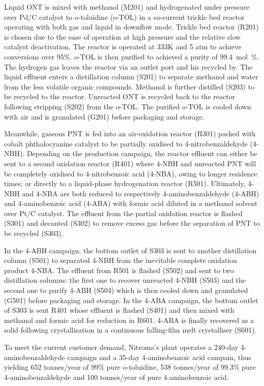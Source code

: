 Liquid ONT is mixed with methanol (M201) and hydrogenated under pressure over Pd/C catalyst to o-toluidine (o-TOL) in a co-current trickle bed reactor operating with both gas and liquid in downflow mode. Trickle bed reactor (R201) is chosen due to the ease of operation at high pressure and the relative slow catalyst deactivation. The reactor is operated at 333K and 5 atm to achieve conversions over 95\%. o-TOL is then purified to achieved a purity of \SI{99.4}{mol\percent}. The hydrogen gas leaves the reactor via an outlet port and his recycled by. The liquid effluent enters a distillation column (S201) to separate methanol and water from the less volatile organic compounds. Methanol is further distilled (S203) to be recycled to the reactor. Unreacted ONT is recycled back to the reactor following stripping (S202) from the o-TOL. The purified o-TOL is cooled down with air and is granulated (G201) before packaging and storage.

Meanwhile, gaseous PNT is fed into an air-oxidation reactor (R301) packed with cobalt phthalocyanine catalyst to be partially oxidised to 4-nitrobenzaldehyde (4-NBH). Depending on the production campaign, the reactor effluent can either be sent to a second oxidation reactor (R401) where 4-NBH and unreacted PNT will be completely oxidised to 4-nitrobenzoic acid (4-NBA), owing to longer residence times; or directly to a liquid-phase hydrogenation reactor (R501). Ultimately, 4-NBH and 4-NBA are both reduced to respectively 4-aminobenzaldehyde (4-ABH) and 4-aminobenzoic acid (4-ABA) with formic acid diluted in a methanol solvent over Pt/C catalyst. The effluent from the partial oxidation reactor is flashed (S301) and decanted (S302) to remove excess gas before the separation of PNT to be recycled (S303). 

In the 4-ABH campaign, the bottom outlet of S303 is sent to another distillation column (S501) to separated 4-NBH from the inevitable complete oxidation product 4-NBA. The effluent from R501 is flashed (S502) and sent to two distillation columns: the first one to recover unreacted 4-NBH (S503) and the second one to purify 4-ABH (S504) which is then cooled down and granulated (G501) before packaging and storage.  
In the 4-ABA campaign, the bottom outlet of S303 is sent R401 whose effluent is flashed (S401) and then mixed with methanol and formic acid for reduction in R601. 4-ABA is finally recovered as a solid following  crystallisation in a continuous falling-film melt crystalliser (S601).

To meet the current customer demand, Nitroma's plant operates a 240-day 4-aminobenzaldehyde campaign and a 35-day 4-aminobenzoic acid campain, thus yielding 652 tonnes/year of 99\% pure o-toluidine, 538 tonnes/year of 99.3\% pure 4-aminobenzaldehyde and 100 tonnes/year of pure 4-aminobenzoic acid.

